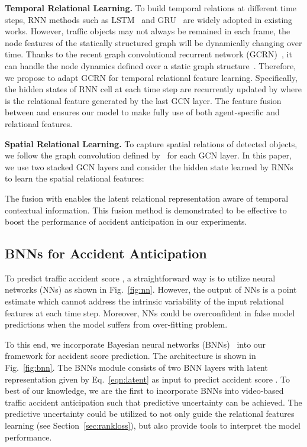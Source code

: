\documentclass[sigconf]{acmart}
\begin{document}
\textbf{Temporal Relational Learning.} To build temporal relations at different time steps, RNN methods such as LSTM~\cite{LSTM} and GRU~\cite{GRU} are widely adopted in existing works. However, traffic objects may not always be remained in each frame, the node features of the statically structured graph will be dynamically changing over time. Thanks to the recent graph convolutional recurrent network (GCRN)~\cite{SeoICLR2017}, it can handle the node dynamics defined over a static graph structure~\cite{HajiramezanaliNIPS2019}. Therefore, we propose to adapt GCRN for temporal relational feature learning. Specifically, the hidden states  of RNN cell at each time step are recurrently updated by
where  is the relational feature generated by the last GCN layer. The feature fusion between  and  ensures our model to make fully use of both agent-specific and relational features.

\textbf{Spatial Relational Learning.} To capture spatial relations of detected objects, we follow the graph convolution defined by~\cite{DefferrardNIPS2016,KipfICLR2017} for each GCN layer. In this paper, we use two stacked GCN layers and consider the hidden state  learned by RNNs to learn the spatial relational features:

The fusion with  enables the latent relational representation aware of temporal contextual information. This fusion method is demonstrated to be effective to boost the performance of accident anticipation in our experiments.

\subsection{BNNs for Accident Anticipation}

To predict traffic accident score , a straightforward way is to utilize neural networks (NNs) as shown in Fig.~\ref{fig:nn}. However, the output of NNs is a point estimate which cannot address the intrinsic variability of the input relational features at each time step. Moreover, NNs could be overconfident in false model predictions when the model suffers from over-fitting problem.

To this end, we incorporate Bayesian neural networks (BNNs)~\cite{DenkerNIPS1990,NealBook2012} into our framework for accident score prediction. The architecture is shown in Fig.~\ref{fig:bnn}. The BNNs module consists of two BNN layers with latent representation  given by Eq.~\ref{eqn:latent} as input to predict accident score . To best of our knowledge, we are the first to incorporate BNNs into video-based traffic accident anticipation such that predictive uncertainty can be achieved. The predictive uncertainty could be utilized to not only guide the relational features learning (see Section~\ref{sec:rankloss}), but also provide tools to interpret the model performance.
\end{document}
